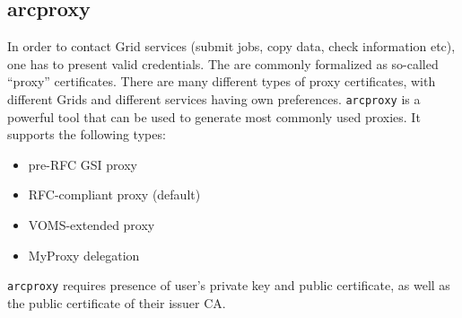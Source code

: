\subsection{arcproxy}
\label{sec:arcproxy}

In order to contact Grid services
(submit jobs, copy data, check information etc),
one has to present valid credentials. The are commonly formalized as so-called
``proxy'' certificates. There are many different types of proxy certificates,
with different Grids and different services having own preferences. \texttt{arcproxy}
is a powerful tool that can be used to generate most commonly used proxies. It supports
the following types:
\begin{itemize}
  \item pre-RFC GSI proxy
  \item RFC-compliant proxy (default)
  \item VOMS-extended proxy
  \item MyProxy delegation
\end{itemize}

\texttt{arcproxy} requires presence of user's private key and public certificate,
as well as the public certificate of their issuer CA.

